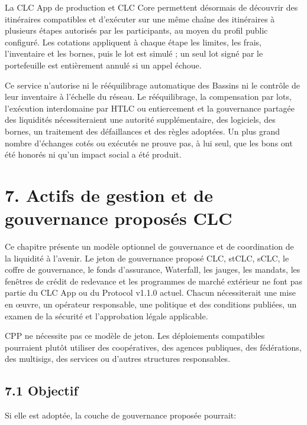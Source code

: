 \documentclass[11pt]{article}
\begin{document}
La CLC App de production et CLC Core permettent désormais de découvrir des itinéraires compatibles et d'exécuter sur une même chaîne des itinéraires à plusieurs étapes autorisés par les participants, au moyen du profil public configuré. Les cotations appliquent à chaque étape les limites, les frais, l'inventaire et les bornes, puis le lot est simulé ; un seul lot signé par le portefeuille est entièrement annulé si un appel échoue.

Ce service n'autorise ni le rééquilibrage automatique des Bassins ni le contrôle de leur inventaire à l'échelle du réseau. Le rééquilibrage, la compensation par lots, l'exécution interdomaine par HTLC ou entiercement et la gouvernance partagée des liquidités nécessiteraient une autorité supplémentaire, des logiciels, des bornes, un traitement des défaillances et des règles adoptées. Un plus grand nombre d'échanges cotés ou exécutés ne prouve pas, à lui seul, que les bons ont été honorés ni qu'un impact social a été produit.


\section*{7. Actifs de gestion et de gouvernance proposés CLC}

Ce chapitre présente un modèle optionnel de gouvernance et de coordination de la liquidité à l'avenir. Le jeton de gouvernance proposé CLC, stCLC, sCLC, le coffre de gouvernance, le fonds d'assurance, Waterfall, les jauges, les mandats, les fenêtres de crédit de redevance et les programmes de marché extérieur ne font pas partie du CLC App ou du Protocol v1.1.0 actuel. Chacun nécessiterait une mise en œuvre, un opérateur responsable, une politique et des conditions publiées, un examen de la sécurité et l'approbation légale applicable.

CPP ne nécessite pas ce modèle de jeton. Les déploiements compatibles pourraient plutôt utiliser des coopératives, des agences publiques, des fédérations, des multisigs, des services ou d'autres structures responsables.

\subsection*{7.1 Objectif}

Si elle est adoptée, la couche de gouvernance proposée pourrait:
\end{document}
